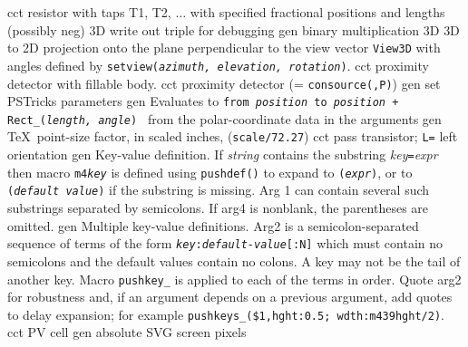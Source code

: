  {cct}%
  {resistor with taps T1, T2, $\ldots$
    with specified fractional positions and lengths (possibly neg)
   }%
%
  {3D} {write out triple for debugging}%
%
  {gen}%
  {binary multiplication}%
%
  {3D}%
  {3D to 2D projection onto the plane perpendicular to the view
  vector {\tt View3D} with angles defined by
  {\tt setview({\sl azimuth, elevation, rotation})}.}%
%
  {cct}%
  {proximity detector with fillable body.}%
%
  {cct}%
  {proximity detector (= {\tt consource(,P)})}%
%
  {gen}%
  {set PSTricks parameters}%
%
  {gen}%
  {Evaluates to {\tt from {\sl position} to
   {\sl position} + Rect\_({\sl length, angle}) }
   from the polar-coordinate data in the arguments }%
%
  {gen}%
  {\TeX\ point-size factor, in scaled inches, ({\tt *scale/72.27})}%
%
  {cct}%
  {pass transistor; {\tt L=} left orientation
    }%
%
  {gen}%
  {Key-value definition.
  If {\sl string} contains the substring
  {\sl key}{\tt =}{\sl expr} then macro {\tt m4{\sl key}}
  is defined using {\tt pushdef()} to
  expand to {\tt ({\sl expr})}, or to {\tt ({\sl default value})} if the
  substring is missing.  Arg 1 can contain several such substrings separated
  by semicolons.
  If arg4 is nonblank, the parentheses are omitted.
   }%
%
  {gen}%
  {Multiple key-value definitions. Arg2 is a semicolon-separated
   sequence of terms of the form {\tt {\sl key}:{\sl default-value}[:N]}
   which must contain no semicolons and the default values contain no colons.
   A key may not be the tail of another key.
   Macro {\tt pushkey\_} is applied to each of the terms in order.
   Quote arg2 for robustness and, if an argument depends on a previous
   argument, add quotes to delay expansion; for example
   {\tt pushkeys\_(\$1,hght:0.5;
     wdth:m4\char39hght/2)}.
   }%
%
  {cct}%
  {PV cell}%
%
  {gen}%
  {absolute SVG screen pixels}%

